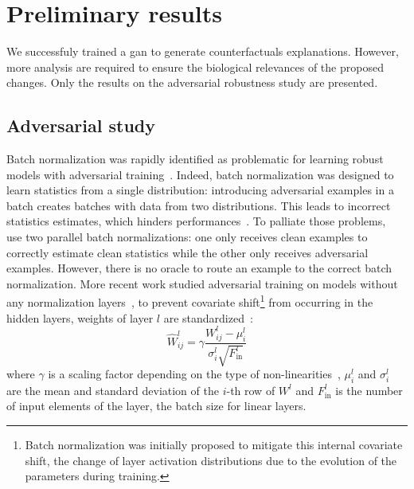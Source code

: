 \documentclass[../main.tex]{subfiles}
\begin{document}
\section{Preliminary results}
	We successfuly trained a \gls{gan} to generate counterfactuals explanations.
	However, more analysis are required to ensure the biological relevances of the proposed changes.
	Only the results on the adversarial robustness study are presented.
	\subsection{Adversarial study}
		Batch normalization was rapidly identified as problematic for learning robust models with adversarial training~\cite{AdvBNProblems,xie2019intriguingpropertiesadversarialtraining}.
		Indeed, batch normalization was designed to learn statistics from a single distribution: introducing adversarial examples in a batch creates batches with data from two distributions.
		This leads to incorrect statistics estimates, which hinders performances~\cite{AdvBNProblems,BNAdvStats}.
		To palliate those problems, \citeauthor{AdvBNProblems}~\cite{AdvBNProblems} use two parallel batch normalizations: one only receives clean examples to correctly estimate clean statistics while the other only receives adversarial examples.
		However, there is no oracle to route an example to the correct batch normalization.
		More recent work studied adversarial training on models without any normalization layers~\cite{wang2022removing}, to prevent covariate shift\footnote{Batch normalization was initially proposed to mitigate this internal covariate shift, the change of layer activation distributions due to the evolution of the parameters during training.} from occurring in the hidden layers, weights of layer \(l\) are standardized~\cite{brock2021characterizing}:
		\begin{equation}
			\hat{W}^{l}_{ij} = \gamma\frac{W^{l}_{ij} - \mu^{l}_{i}}{\sigma^{l}_{i}\sqrt{F^{l}_{\text{in}}}}
		\end{equation}
		where \(\gamma\) is a scaling factor depending on the type of non-linearities~\cite{brock2021characterizing}, \(\mu^{l}_{i}\) and \(\sigma^{l}_{i}\) are the mean and standard deviation of  the \(i\)-th row of \(W^{l}\) and \(F^{l}_{\text{in}}\) is the number of input elements of the layer, \ie{}the batch size for linear layers.
\end{document}
